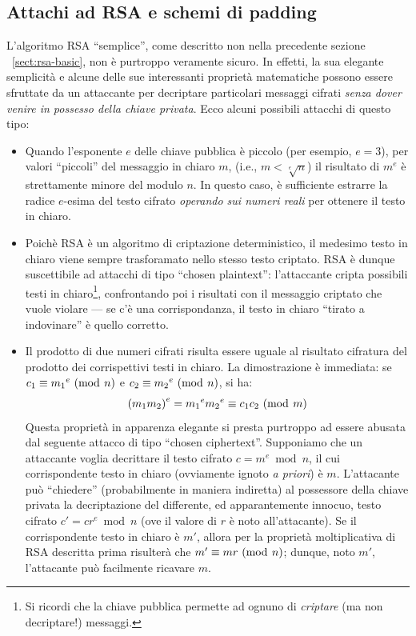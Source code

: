 \documentclass[pdflatex,11pt,a4paper,oneside]{article}
\let\OldEmph\emph
\renewcommand{\emph}[1]{\OldEmph{#1\/}}
\newcommand{\p}[1]{\left({#1}\right)}
\newcommand{\congruent}[0]{\equiv}
\newcommand{\mmodop}[0]{\ensuremath{\operatorname{mod}}}
\newcommand{\mmod}[1]{\ensuremath{\allowbreak\ (\mmodop\:{#1})}}
\newcommand{\rem}[2]{\ensuremath{{#1}\:\mmodop\:{#2}}}
\begin{document}
\subsection{Attachi ad RSA e schemi di padding}\label{sect:rsa-padding}

L'algoritmo RSA ``semplice'', come descritto non nella precedente sezione%
~\eqref{sect:rsa-basic}, non \`e purtroppo veramente sicuro.  In effetti,
la sua elegante semplicit\`a e alcune delle sue interessanti propriet\`a
matematiche possono essere sfruttate da un attaccante per decriptare
particolari messaggi cifrati \emph{senza dover venire in possesso della
chiave privata}.  Ecco alcuni possibili attacchi di questo tipo:
\begin{itemize}
\item
  Quando l'esponente $e$ delle chiave pubblica \`e piccolo (per esempio,
  $e = 3$), per valori ``piccoli'' del messaggio in chiaro $m$, (i.e.,
  $m < \sqrt[e]{n}$) il risultato di $m^e$ \`e strettamente minore del
  modulo $n$. In questo caso, \`e sufficiente estrarre la radice
  $e$-esima del testo cifrato \emph{operando sui numeri reali} per
  ottenere il testo in chiaro.
\item
  Poich\`e RSA \`e un algoritmo di criptazione deterministico, il medesimo
  testo in chiaro viene sempre trasforamato nello stesso testo criptato.
  RSA \`e dunque suscettibile ad attacchi di tipo ``chosen plaintext'':
  l'attaccante cripta possibili testi in chiaro\footnote{Si ricordi che
  la chiave pubblica permette ad ognuno di \emph{criptare} (ma non
  decriptare!) messaggi.}, confrontando poi i risultati con il messaggio
  criptato che vuole violare --- se c'\`e una corrispondanza, il testo in
  chiaro ``tirato a indovinare'' \`e quello corretto.
\item
  Il prodotto di due numeri cifrati risulta essere uguale al risultato
  cifratura del prodotto dei corrispettivi testi in chiaro.  La
  dimostrazione \`e immediata: se $c_1 \congruent {m_1}^e \mmod n$ e
  $c_2 \congruent {m_2}^e \mmod n$, si ha:
  \vspace*{-3pt}
  \begin{displaymath}
    \p{m_1 m_2}^e = {m_1}^e {m_2}^e \congruent c_1 c_2 \mmod m
  \vspace*{-3pt}
  \end{displaymath}
  Questa propriet\`a in apparenza elegante si presta purtroppo ad essere
  abusata dal seguente attacco di tipo ``chosen ciphertext''.   Supponiamo
  che un attaccante voglia decrittare il testo cifrato $c = \rem{m^e}{n}$,
  il cui corrispondente testo in chiaro (ovviamente ignoto \emph{a priori})
  \`e $m$.  L'attacante pu\`o ``chiedere'' (probabilmente in maniera
  indiretta) al possessore della chiave privata la decriptazione del
  differente, ed apparantemente innocuo, testo cifrato $c' = \rem{cr^e}{n}$
  (ove il valore di $r$ \`e noto all'attacante).  Se il corrispondente
  testo in chiaro \`e $m'$, allora per la propriet\`a moltiplicativa di
  RSA descritta prima risulter\`a che $m' \congruent  mr \mmod n$; dunque,
  noto $m'$, l'attacante pu\`o facilmente ricavare $m$.
\end{itemize}
\end{document}
